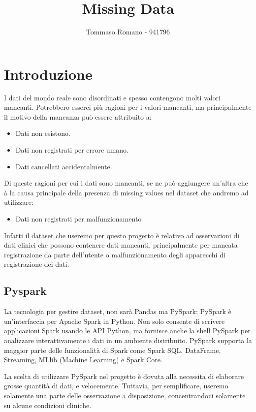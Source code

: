 \documentclass[11pt, oneside]{article}
\title{Missing Data}
\author{Tommaso Romano - 941796}
\begin{document}
\maketitle

\tableofcontents
\pagebreak
\section{Introduzione}

I dati del mondo reale sono disordinati e spesso contengono molti valori mancanti. Potrebbero esserci più ragioni per i valori mancanti, ma principalmente il motivo della mancanza può essere attribuito a:
\begin{itemize}
\item Dati non esistono.
\item Dati non registrati per errore umano.
\item Dati cancellati accidentalmente.
\end{itemize}

Di queste ragioni per cui i dati sono mancanti, se ne può aggiungere un'altra che à la causa principale della presenza di missing values nel dataset che andremo ad utilizzare: 
\begin{itemize}
\item Dati non registrati per malfunzionamento  
\end{itemize}

Infatti il dataset che useremo per questo progetto è relativo ad osservazioni di dati clinici che possono contenere dati mancanti, principalmente per mancata registrazione da parte dell'utente o malfunzionamento degli apparecchi di registrazione dei dati.

\subsection{Pyspark}

La tecnologia per gestire dataset, non sarà Pandas ma PySpark: PySpark è un'interfaccia per Apache Spark in Python. Non solo consente di scrivere applicazioni Spark usando le API Python, ma fornisce anche la shell PySpark per analizzare interattivamente i dati in un ambiente distribuito. PySpark supporta la maggior parte delle funzionalità di Spark come Spark SQL, DataFrame, Streaming, MLlib (Machine Learning) e Spark Core.


La scelta di utilizzare PySpark nel progetto è dovuta alla necessita di elaborare grosse quantità di dati, e velocemente. Tuttavia, per semplificare, useremo solamente una parte delle osservazione a disposizione, concentrandoci solamente su alcune condizioni cliniche. 
\end{document}
